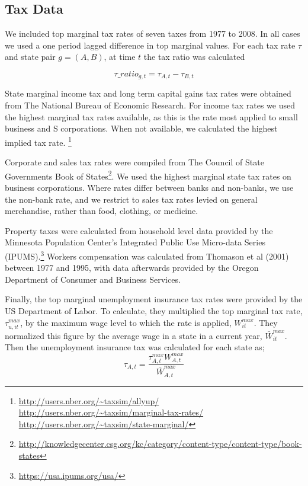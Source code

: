 \subsection{Tax Data}

We included top marginal tax rates of seven taxes from 1977 to 2008. In all cases we used a one period lagged difference in top marginal values. For each tax rate $\tau$ and state pair $g = (A,B)$, at time $t$ the tax ratio was calculated 

\begin{equation} \tau\_ratio_{g,t} = \tau_{A,t}-\tau_{B,t} \end{equation}

State marginal income tax and long term capital gains tax rates were obtained from The National Bureau of Economic Research. For income tax rates we used the highest marginal tax rates available, as this is the rate most applied to small business and S corporations. When not available, we calculated the highest implied tax rate. \footnote{\url{http://users.nber.org/~taxsim/allyup/} \url{http://users.nber.org/~taxsim/marginal-tax-rates/} \url{http://users.nber.org/~taxsim/state-marginal/}}

Corporate and sales tax rates were compiled from The Council of State Governments Book of States\footnote{\url{http://knowledgecenter.csg.org/kc/category/content-type/content-type/book-states}}. We used the highest marginal state tax rates on business corporations. Where rates differ between banks and non-banks, we use the non-bank rate, and we restrict to sales tax rates levied on general merchandise, rather than food, clothing, or medicine. 

Property taxes were calculated from household level data provided by the Minnesota Population Center's Integrated Public Use Micro-data Series (IPUMS).\footnote{\url{https://usa.ipums.org/usa/}} Workers compensation was calculated from Thomason et al (2001) between 1977 and 1995, with data afterwards provided by the Oregon Department of Consumer and Business Services. 

Finally, the top marginal unemployment insurance tax rates were provided by the US Department of Labor. To calculate, they multiplied the top marginal tax rate, $\tau_{u,it}^{max}$, by the maximum wage level to which the rate is applied, $W_{it}^{max}$. They normalized this figure by the average wage in a state in a current year, $\bar W_{it}^{max}$. Then the unemployment insurance tax was calculated for each state as;
\begin{equation} \tau_{A,t} = \frac{\tau_{A,t}^{max}W_{A,t}^{max}}{\bar W_{A,t}^{max}}\end{equation}

